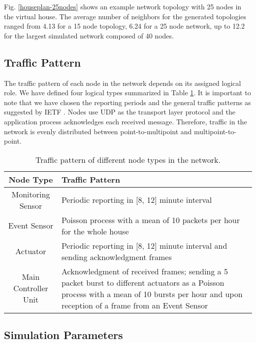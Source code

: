 \documentclass[conference,10pt,a4paper]{IEEEtran}
\begin{document}
Fig. \ref{houseplan-25nodes} shows an example network topology with 25 nodes in
the virtual house. 
The average number of neighbors for the generated topologies ranged from 4.13
for a 15 node topology, 6.24 for a  25 node network, up to 12.2 for the
largest simulated network composed of 40 nodes.

\vspace{-0.2cm}\subsection{Traffic Pattern}
\label{traffic-pattern}

The traffic pattern of each node in the network depends on its assigned logical
role. We have defined four logical types summarized in Table
\ref{tab:traffic-patern}.
It is important to note that we have chosen the reporting periods and the
general traffic patterns as suggested by IETF
\cite{routingreq-home}. 
Nodes use UDP as the transport layer protocol and the application process
acknowledges each received message. Therefore, traffic in the network is evenly
distributed between point-to-multipoint and multipoint-to-point. 


\begin{table}[htbp]
\centering
    \caption{Traffic pattern of different node types in the network. \label{tab:traffic-patern}
    \vspace{-1.5mm}
    }
    {
    \begin{tabular}{ c p{5.4cm}}
    \hline
    {Node Type} & {Traffic Pattern} \\ \hline \hline
    Monitoring Sensor& Periodic reporting in [8, 12] minute interval \\ \hline
    Event Sensor& Poisson process with a mean of 10 packets per hour for the whole house \\ \hline
    Actuator & Periodic reporting in [8, 12] minute interval and sending acknowledgment frames \\ \hline
Main Controller Unit & Acknowledgment of received frames; sending a 5 packet burst to
    different actuators as a Poisson process with a mean of 10 bursts per hour and upon reception of a frame from an Event Sensor\\
    \hline
    \end{tabular}
    }
    \end{table}
	
\vspace{-0.2cm}\subsection{Simulation Parameters}
\label{parameters}
\end{document}
